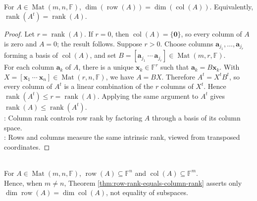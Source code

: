 \begin{theorem} \label{thm:row-rank-equals-column-rank} \\
For $A\in\operatorname{Mat}(m,n,\mathbb{F})$, $\dim(\operatorname{row}(A))=\dim(\operatorname{col}(A))$. Equivalently, $\operatorname{rank}(A^t)=\operatorname{rank}(A)$.
\begin{proof}
Let $r=\operatorname{rank}(A)$. If $r=0$, then $\operatorname{col}(A)=\{\mathbf{0}\}$, so every column of $A$ is zero and $A=0$; the result follows. Suppose $r>0$. Choose columns $\mathbf{a}_{j_1},\ldots,\mathbf{a}_{j_r}$ forming a basis of $\operatorname{col}(A)$, and set $B=[\mathbf{a}_{j_1}\ \cdots\ \mathbf{a}_{j_r}]\in\operatorname{Mat}(m,r,\mathbb{F})$.\\
For each column $\mathbf{a}_k$ of $A$, there is a unique $\mathbf{x}_k\in\mathbb{F}^r$ such that $\mathbf{a}_k=B\mathbf{x}_k$. With $X=[\mathbf{x}_1\ \cdots\ \mathbf{x}_n]\in\operatorname{Mat}(r,n,\mathbb{F})$, we have $A=BX$. Therefore $A^t=X^tB^t$, so every column of $A^t$ is a linear combination of the $r$ columns of $X^t$. Hence $\operatorname{rank}(A^t)\leq r=\operatorname{rank}(A)$. Applying the same argument to $A^t$ gives $\operatorname{rank}(A)\leq\operatorname{rank}(A^t)$.\\
: Column rank controls row rank by factoring $A$ through a basis of its column space.\\
: Rows and columns measure the same intrinsic rank, viewed from transposed coordinates.
\end{proof}
\end{theorem}

\begin{perspective} \label{per:row-column-rank-different-hosts} \\
For $A\in\operatorname{Mat}(m,n,\mathbb{F})$, $\operatorname{row}(A)\subseteq\mathbb{F}^n$ and $\operatorname{col}(A)\subseteq\mathbb{F}^m$.\\
Hence, when $m\neq n$, Theorem \ref{thm:row-rank-equals-column-rank} asserts only $\dim\operatorname{row}(A)=\dim\operatorname{col}(A)$, not equality of subspaces.
\end{perspective}

